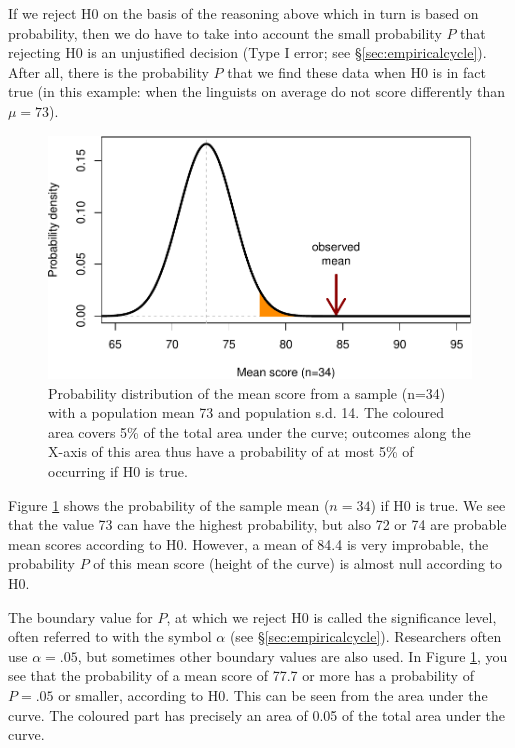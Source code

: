 \documentclass[
]{book}
\begin{document}
If we reject H0 on the basis of the reasoning above which in turn is
based on probability, then we do have to take into account the small
probability \(P\) that rejecting H0 is an unjustified decision (Type I error; see
§\ref{sec:empiricalcycle}). After all, there is the probability \(P\) that
we find these data when H0 is in fact true (in this example: when the linguists
on average do not score differently than \(\mu=73\)).

\begin{figure}
\centering
\includegraphics{QMS-EN_files/figure-latex/gramm2013onesample-1.pdf}
\caption{\label{fig:gramm2013onesample}Probability distribution of the mean score from a sample (n=34) with a population mean 73 and population s.d. 14. The coloured area covers 5\% of the total area under the curve; outcomes along the X-axis of this area thus have a probability of at most 5\% of occurring if H0 is true.}
\end{figure}

Figure \ref{fig:gramm2013onesample} shows the probability of the
sample mean (\(n=34\)) if H0 is true. We see that the value 73 can have
the highest probability, but also 72 or 74 are probable mean scores
according to H0. However, a mean of 84.4 is very improbable, the probability
\(P\) of this mean score (height of the curve) is almost null according to
H0.

The boundary value for \(P\), at which we reject H0 is called the significance
level, often referred to with the symbol \(\alpha\) (see
§\ref{sec:empiricalcycle}). Researchers often use \(\alpha=.05\),
but sometimes other boundary values are also used. In Figure
\ref{fig:gramm2013onesample}, you see that the probability of a mean score
of 77.7 or more has a probability of \(P=.05\) or smaller, according to
H0. This can be seen from the area under the curve. The coloured part has
precisely an area of 0.05 of the total area under
the curve.
\end{document}
